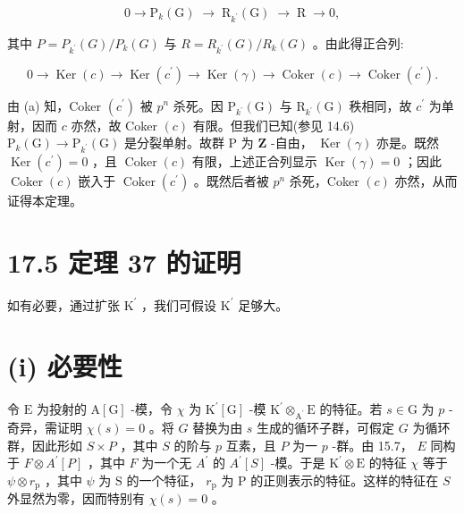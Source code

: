 \documentclass[10pt]{article}
\begin{document}
\[
0 \rightarrow  {\mathrm{P}}_{k}\left( \mathrm{G}\right) \; \rightarrow  \;{\mathrm{R}}_{{k}^{\prime }}\left( \mathrm{G}\right) \; \rightarrow  \;\mathrm{R}\; \rightarrow  0,
\]

其中 \(P = {P}_{{k}^{\prime }}\left( G\right) /{P}_{k}\left( G\right)\) 与 \(R = {R}_{{k}^{\prime }}\left( G\right) /{R}_{k}\left( G\right)\) 。由此得正合列:

\[
0 \rightarrow  \operatorname{Ker}\left( c\right)  \rightarrow  \operatorname{Ker}\left( {c}^{\prime }\right)  \rightarrow  \operatorname{Ker}\left( \gamma \right)  \rightarrow  \operatorname{Coker}\left( c\right)  \rightarrow  \operatorname{Coker}\left( {c}^{\prime }\right) .
\]

由 (a) 知，Coker \(\left( {c}^{\prime }\right)\) 被 \({p}^{n}\) 杀死。因 \({\mathrm{P}}_{{k}^{\prime }}\left( \mathrm{G}\right)\) 与 \({\mathrm{R}}_{{k}^{\prime }}\left( \mathrm{G}\right)\) 秩相同，故 \({c}^{\prime }\) 为单射，因而 \(c\) 亦然，故 Coker \(\left( c\right)\) 有限。但我们已知(参见 14.6) \({\mathrm{P}}_{k}\left( \mathrm{G}\right)  \rightarrow  {\mathrm{P}}_{{k}^{\prime }}\left( \mathrm{G}\right)\) 是分裂单射。故群 \(\mathrm{P}\) 为 \(\mathbf{Z}\) -自由， \(\operatorname{Ker}\left( \gamma \right)\) 亦是。既然 \(\operatorname{Ker}\left( {c}^{\prime }\right)  = 0\) ，且 \(\operatorname{Coker}\left( c\right)\) 有限，上述正合列显示 \(\operatorname{Ker}\left( \gamma \right)  = 0\) ；因此 \(\operatorname{Coker}\left( c\right)\) 嵌入于 \(\operatorname{Coker}\left( {c}^{\prime }\right)\) 。既然后者被 \({p}^{n}\) 杀死，Coker \(\left( c\right)\) 亦然，从而证得本定理。

\section*{17.5 定理 37 的证明}

如有必要，通过扩张 \({\mathrm{K}}^{\prime }\) ，我们可假设 \({\mathrm{K}}^{\prime }\) 足够大。

\section*{(i) 必要性}

令 \(\mathrm{E}\) 为投射的 \(\mathrm{A}\left\lbrack  \mathrm{G}\right\rbrack\) -模，令 \(\chi\) 为 \({\mathrm{K}}^{\prime }\left\lbrack  \mathrm{G}\right\rbrack\) -模 \({\mathrm{K}}^{\prime }{ \otimes  }_{{\mathrm{A}}^{\prime }}\mathrm{E}\) 的特征。若 \(s \in  \mathrm{G}\) 为 \(p\) -奇异，需证明 \(\chi \left( s\right)  = 0\) 。将 \(G\) 替换为由 \(s\) 生成的循环子群，可假定 \(G\) 为循环群，因此形如 \(S \times  P\) ，其中 \(S\) 的阶与 \(p\) 互素，且 \(P\) 为一 \(p\) -群。由 15.7， \(E\) 同构于 \(F \otimes  {A}^{\prime }\left\lbrack  P\right\rbrack\) ，其中 \(F\) 为一个无 \({A}^{\prime }\) 的 \({A}^{\prime }\left\lbrack  S\right\rbrack\) -模。于是 \({\mathrm{K}}^{\prime } \otimes  \mathrm{E}\) 的特征 \(\chi\) 等于 \(\psi  \otimes  {r}_{\mathrm{p}}\) ，其中 \(\psi\) 为 \(\mathrm{S}\) 的一个特征， \({r}_{\mathrm{p}}\) 为 \(\mathrm{P}\) 的正则表示的特征。这样的特征在 \(S\) 外显然为零，因而特别有 \(\chi \left( s\right)  = 0\) 。
\end{document}
